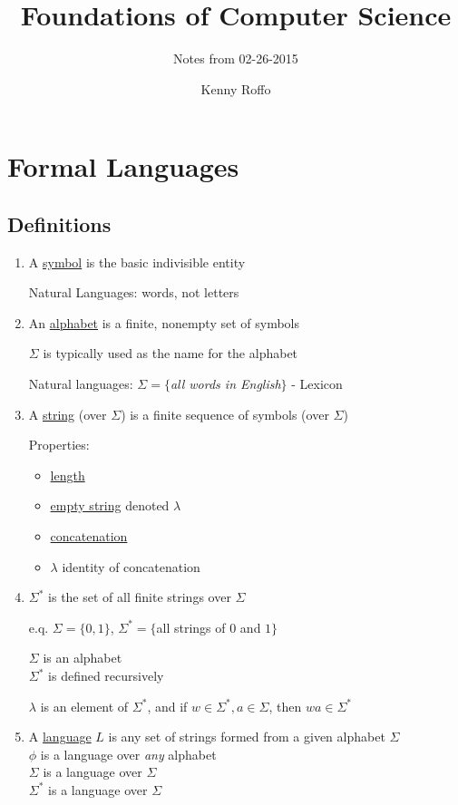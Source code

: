 \documentclass{scrartcl}
\title{Foundations of Computer Science}
\subtitle{Notes from 02-26-2015}
\author{Kenny Roffo}
\begin{document}
\maketitle
\tableofcontents\pagebreak

\section{Formal Languages}

\subsection{Definitions}

\begin{enumerate}

\item A \underline{symbol} is the basic indivisible entity

Natural Languages: words, not letters

\item An \underline{alphabet} is a finite, nonempty set of symbols

$\Sigma$ is typically used as the name for the alphabet

Natural languages: $\Sigma=\{$\emph{all words in English}$\}$ - Lexicon 

\item A \underline{string} (over $\Sigma$) is a finite sequence of symbols (over $\Sigma$)

  Properties: \begin{itemize}
  \item \underline{length}
  \item \underline{empty string} denoted $\lambda$
  \item \underline{concatenation}
  \item $\lambda$ identity of concatenation
  \end{itemize} 

\item $\Sigma ^*$ is the set of all finite strings over $\Sigma$

e.q. $\Sigma=\{0,1\}$, $\Sigma ^* = \{$all strings of $0$ and $1\}$

$\Sigma$ is an alphabet\\
$\Sigma ^*$ is defined recursively

$\lambda$ is an element of $\Sigma ^*$, and if $w \in \Sigma ^*, a \in \Sigma$, then $wa \in \Sigma ^*$

\item A \underline{language} $L$ is any set of strings formed from a given alphabet $\Sigma$\\
$\phi$ is a language over \emph{any} alphabet\\
$\Sigma$ is a language over $\Sigma$\\
$\Sigma ^*$ is a language over $\Sigma$
\end{enumerate}
\end{document}

